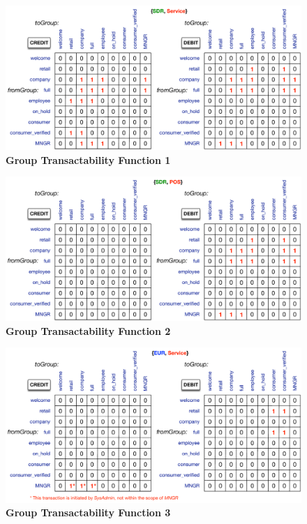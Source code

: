 \begin{figure}[H]
\centering
\includegraphics[width=17cm]{Figures/GTF1}
\caption{\small\textbf{Group Transactability Function 1}}
\label{fig:GTF1}
\end{figure}

\begin{figure}[H]
\centering
\includegraphics[width=17cm]{Figures/GTF2}
\caption{\small\textbf{Group Transactability Function 2}}
\label{fig:GTF2}
\end{figure}

\begin{figure}[H]
\centering
\includegraphics[width=17cm]{Figures/GTF3}
\caption{\small\textbf{Group Transactability Function 3}}
\label{fig:GTF3}
\vspace{-1cm}
\end{figure}

